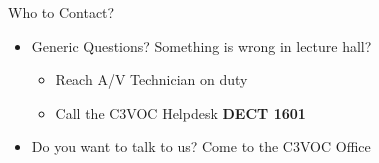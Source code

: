 
\begin{frame}{Who to Contact?}
	\begin{itemize}
		\item Generic Questions? Something is wrong in lecture hall?
		\begin{itemize}
			\item Reach A/V Technician on duty
			\item Call the C3VOC Helpdesk \textbf{DECT 1601}
		\end{itemize}
		\item Do you want to talk to us? Come to the C3VOC Office
	\end{itemize}
\end{frame}
